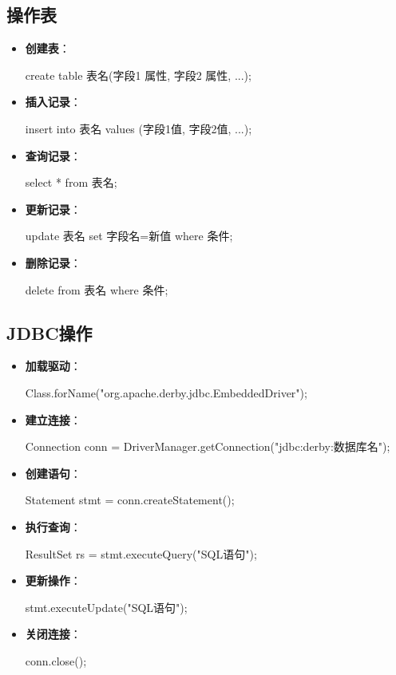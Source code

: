 \documentclass[a4paper, 10pt]{ctexart}
\begin{document}
\subsection{操作表}
\begin{itemize}
  \item \textbf{创建表}：
  \begin{codeblock}
create table 表名(字段1 属性, 字段2 属性, ...);
  \end{codeblock}
  \item \textbf{插入记录}：
  \begin{codeblock}
insert into 表名 values (字段1值, 字段2值, ...);
  \end{codeblock}
  \item \textbf{查询记录}：
  \begin{codeblock}
select * from 表名;
  \end{codeblock}
  \item \textbf{更新记录}：
  \begin{codeblock}
update 表名 set 字段名=新值 where 条件;
  \end{codeblock}
  \item \textbf{删除记录}：
  \begin{codeblock}
delete from 表名 where 条件;
  \end{codeblock}
\end{itemize}

\subsection{JDBC操作}
\begin{itemize}
  \item \textbf{加载驱动}：
  \begin{codeblock}
Class.forName("org.apache.derby.jdbc.EmbeddedDriver");
  \end{codeblock}
  \item \textbf{建立连接}：
  \begin{codeblock}
Connection conn = DriverManager.getConnection("jdbc:derby:数据库名");
  \end{codeblock}
  \item \textbf{创建语句}：
  \begin{codeblock}
Statement stmt = conn.createStatement();
  \end{codeblock}
  \item \textbf{执行查询}：
  \begin{codeblock}
ResultSet rs = stmt.executeQuery("SQL语句");
  \end{codeblock}
  \item \textbf{更新操作}：
  \begin{codeblock}
stmt.executeUpdate("SQL语句");
  \end{codeblock}
  \item \textbf{关闭连接}：
  \begin{codeblock}
conn.close();
  \end{codeblock}
\end{itemize}
\end{document}
